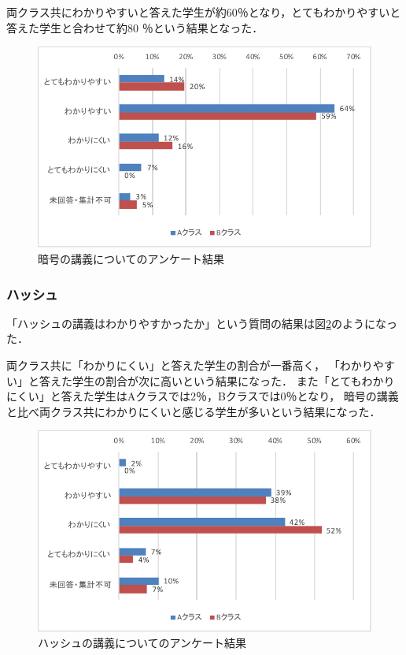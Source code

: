 \documentclass[a4j,12pt]{jsarticle}
\begin{document}
両クラス共にわかりやすいと答えた学生が約60％となり，とてもわかりやすいと答えた学生と合わせて約80
％という結果となった．\\
\begin{figure}[H]
\centering
\includegraphics[width=12cm]{anka1.pdf}
\caption{暗号の講義についてのアンケート結果}
\label{fig:anank}
\end{figure}

\newpage
\subsubsection{ハッシュ}

「ハッシュの講義はわかりやすかったか」という質問の結果は図\ref{fig:hashank}のようになった．

両クラス共に「わかりにくい」と答えた学生の割合が一番高く，
「わかりやすい」と答えた学生の割合が次に高いという結果になった．
また「とてもわかりにくい」と答えた学生はAクラスでは2％，Bクラスでは0％となり，
暗号の講義と比べ両クラス共にわかりにくいと感じる学生が多いという結果になった．\\

\begin{figure}[H]
\centering
\includegraphics[width=12cm]{ankh1.pdf}
\caption{ハッシュの講義についてのアンケート結果}
\label{fig:hashank}
\end{figure}
\end{document}
